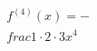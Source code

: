 \documentclass[preview]{standalone}
\begin{document}
\begin{align*}
f^{(4)}(x)=-\\frac{1\cdot2\cdot3}{x^4}
\end{align*}
\end{document}

